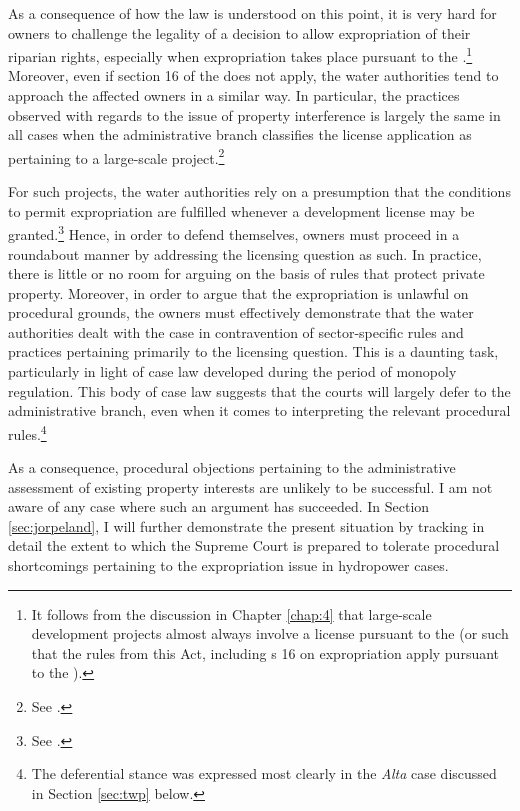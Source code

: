 As a consequence of how the law is understood on this point, it is very hard for owners to challenge the legality of a decision to allow expropriation of their riparian rights, especially when expropriation takes place pursuant to the \cite{wra17}.\footnote{It follows from the discussion in Chapter \ref{chap:4} that large-scale development projects almost always involve a license pursuant to the \cite{wra17} (or such that the rules from this Act, including s 16 on expropriation apply pursuant to the \cite{wra00}).} Moreover, even if section 16 of the \cite{wra17} does not apply, the water authorities tend to approach the affected owners in a similar way. In particular, the practices observed with regards to the issue of property interference is largely the same in all cases when the administrative branch classifies the license application as pertaining to a large-scale project.\footnote{See \cite{flatby08}.}

For such projects, the water authorities rely on a presumption that the conditions to permit expropriation are fulfilled whenever a development license may be granted.\footnote{See \cite{flatby08}.} Hence, in order to defend themselves, owners must proceed in a roundabout manner by addressing the licensing question as such. In practice, there is little or no room for arguing on the basis of rules that protect private property.    Moreover, in order to argue that the expropriation is unlawful on procedural grounds, the owners must effectively demonstrate that the water authorities dealt with the case in contravention of sector-specific rules and practices pertaining primarily to the licensing question. This is a daunting task, particularly in light of case law developed during the period of monopoly regulation. This body of case law suggests that the courts will largely defer to the administrative branch, even when it comes to interpreting the relevant procedural rules.\footnote{The deferential stance was expressed most clearly in the {\it Alta} case discussed in Section \ref{sec:twp} below.}

As a consequence, procedural objections pertaining to the administrative assessment of existing property interests are unlikely to be successful. I am not aware of any case where such an argument has succeeded. In Section \ref{sec:jorpeland}, I will further demonstrate the present situation by tracking in detail the extent to which the Supreme Court is prepared to tolerate procedural shortcomings pertaining to the expropriation issue in hydropower cases.%


